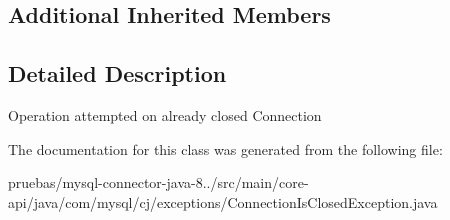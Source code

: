 \subsection*{Additional Inherited Members}


\subsection{Detailed Description}
Operation attempted on already closed Connection 

The documentation for this class was generated from the following file\+:\begin{DoxyCompactItemize}
\item 
pruebas/mysql-\/connector-\/java-\/8../src/main/core-\/api/java/com/mysql/cj/exceptions/Connection\+Is\+Closed\+Exception.\+java\end{DoxyCompactItemize}

